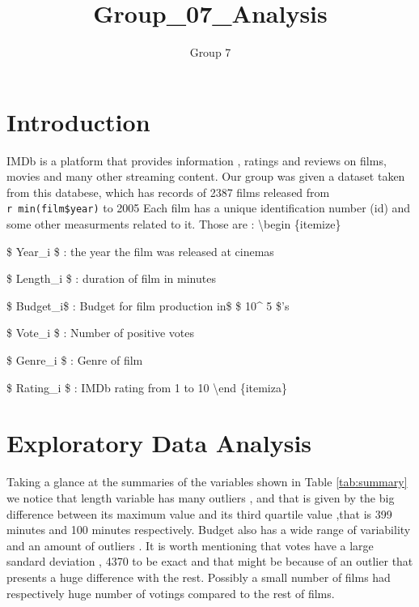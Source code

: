 \documentclass[
]{article}
\title{Group\_07\_Analysis}
\author{Group 7}
\date{}
\begin{document}
\maketitle

\hypertarget{sec:Intro}{%
\section{Introduction}\label{sec:Intro}}

IMDb is a platform that provides information , ratings and reviews on
films, movies and many other streaming content. Our group was given a
dataset taken from this databese, which has records of 2387 films
released from \texttt{r\ min(film\$year)} to 2005 Each film has a unique
identification number (id) and some other measurments related to it.
Those are : \textbackslash begin \{itemize\}

\item

\$ Year\_i \$ : the year the film was released at cinemas

\item

\$ Length\_i \$ : duration of film in minutes

\item

\$ Budget\_i\$ : Budget for film production in\$ \$ 10\^{} 5 \$'s

\item

\$ Vote\_i \$ : Number of positive votes

\item

\$ Genre\_i \$ : Genre of film

\item

\$ Rating\_i \$ : IMDb rating from 1 to 10 \textbackslash end
\{itemiza\}

\hypertarget{sec:EDA}{%
\section{Exploratory Data Analysis}\label{sec:EDA}}

Taking a glance at the summaries of the variables shown in Table
\ref{tab:summary} we notice that length variable has many outliers , and
that is given by the big difference between its maximum value and its
third quartile value ,that is 399 minutes and 100 minutes respectively.
Budget also has a wide range of variability and an amount of outliers .
It is worth mentioning that votes have a large sandard deviation , 4370
to be exact and that might be because of an outlier that presents a huge
difference with the rest. Possibly a small number of films had
respectively huge number of votings compared to the rest of films.
\end{document}
